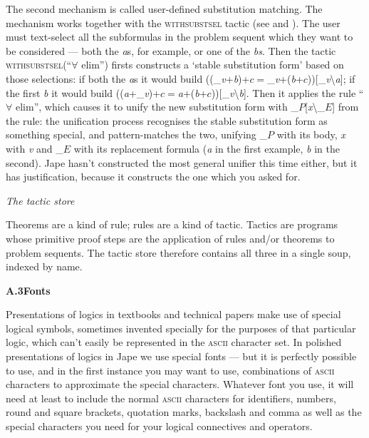 The second mechanism is called user-defined substitution matching. The mechanism works together with the \textsc{withsubstsel} tactic (see  and ). The user must text-select all the subformulas in the problem sequent which they want to be considered --- both the \textit{a}s, for example, or one of the \textit{bs}. Then the tactic \textsc{withsubstsel}(``\ensuremath{\forall} elim'') firsts constructs a `stable substitution form' based on those selections: if both the \textit{a}s it would build ((\_\textit{v}+\textit{b})+$c$\ensuremath{=}\_\textit{v}+(\textit{b}+$c$))[\_\textit{v}{\textbackslash}\textit{a}]; if the first \textit{b} it would build ((\textit{a}+\_\textit{v})+$c$\ensuremath{=}\textit{a}+(\textit{b}+$c$))[\_\textit{v}{\textbackslash}\textit{b}]. Then it applies the rule ``\ensuremath{\forall} elim'', which causes it to unify the new substitution form with \_$P$[\textit{x}{\textbackslash}\_$E$] from the rule: the unification process recognises the stable substitution form as something special, and pattern-matches the two, unifying \_$P$ with its body, \textit{x} with \textit{v} and \_$E$ with its replacement formula (\textit{a} in the first example, \textit{b} in the second). Jape hasn't constructed the most general unifier this time either, but it has justification, because it constructs the one which you asked for.


\textit{The tactic store}


Theorems are a kind of rule; rules are a kind of tactic. Tactics are programs whose primitive proof steps are the application of rules and/or theorems to problem sequents. The tactic store therefore contains all three in a single soup, indexed by name.

\textbf{{\large A.3\tab Fonts}}


Presentations of logics in textbooks and technical papers make use of special logical symbols, sometimes invented specially for the purposes of that particular logic, which can't easily be represented in the \textsc{ascii} character set. In polished presentations of logics in Jape we use special fonts --- but it is perfectly possible to use, and in the first instance you may want to use, combinations of \textsc{ascii} characters to approximate the special characters. Whatever font you use, it will need at least to include the normal \textsc{ascii} characters for identifiers, numbers, round and square brackets, quotation marks, backslash and comma as well as the special characters you need for your logical connectives and operators.


